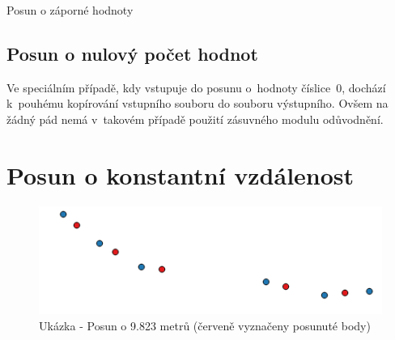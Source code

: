 \begin{algorithm}
\caption{Posun o záporné hodnoty}
\label{alg:pseudozapornehodnoty}
    \begin{algorithmic}[1]

    \ENDWHILE
    \end{algorithmic}
\end{algorithm}

\subsection{Posun o nulový počet hodnot}
\label{nulovehodnoty}

Ve speciálním případě, kdy vstupuje do posunu o~hodnoty číslice~0,
dochází k~pouhé\-mu kopírování vstupního
souboru do souboru výstupního. Ovšem na žádný pád nemá v~takovém případě použití zásuvného modulu
odůvodnění. 

\section{Posun o konstantní vzdálenost}
\label{by_distance}

  \begin{figure}[H]
   \centering
	\includegraphics[scale=1]{./pictures/distance-shift.png}
	\caption[Ukázka - Posun o 9.823 metrů]{Ukázka - Posun o 9.823 metrů (červeně vyznačeny posunuté body)
      \label{fig:distance-shift}}
  \end{figure}

